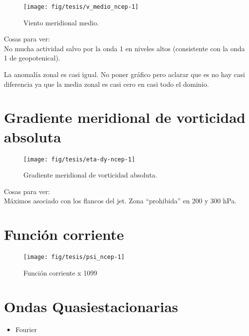 \documentclass[spanish,a4paper]{book}
\providecommand{\tightlist}{%
  \setlength{\itemsep}{0pt}\setlength{\parskip}{0pt}}
\begin{document}
\begin{figure}

{\centering \texttt{[image: fig/tesis/v\_medio\_ncep-1]} 

}

\caption{Viento meridional medio.}\label{fig:v_medio_ncep}
\end{figure}

Cosas para ver:\\
No mucha actividad salvo por la onda 1 en niveles altos (consistente con
la onda 1 de geopotenical).

La anomalía zonal es casi igual. No poner gráfico pero aclarar que es no
hay casi diferencia ya que la media zonal es casi cero en casi todo el
dominio.

\section{Gradiente meridional de vorticidad
absoluta}\label{gradiente-meridional-de-vorticidad-absoluta}

\begin{figure}

{\centering \texttt{[image: fig/tesis/eta-dy-ncep-1]} 

}

\caption{Gradiente meridional de vorticidad absoluta.}\label{fig:eta-dy-ncep}
\end{figure}

Cosas para ver:\\
Máximos asociado con los flancos del jet. Zona ``prohibida'' en 200 y
300 hPa.

\section{Función corriente}\label{funcion-corriente}

\begin{figure*}
\texttt{[image: fig/tesis/psi\_ncep-1]} \caption{Función corriente x 1099}\label{fig:psi_ncep}
\end{figure*}

\section{Ondas Quasiestacionarias}\label{ondas-quasiestacionarias}

\begin{itemize}
\tightlist
\item
  Fourier
\end{itemize}
\end{document}
